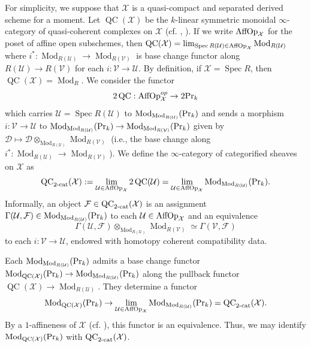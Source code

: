 \documentclass[leqno,12pt]{amsart}
\theoremstyle{plain}
\theoremstyle{definition}
\newcommand{\PR}{\textup{Pr}}
\newcommand{\Spec}{\operatorname{Spec}}
\newcommand{\Mod}{\operatorname{Mod}}
\newcommand{\QC}{\operatorname{QC}}
\newcommand{\XX}{\mathcal{X}}
\begin{document}
For simplicity, we suppose that $\mathcal{X}$ is a quasi-compact and separated derived scheme for a moment.
Let $\QC(\mathcal{X})$ be the $k$-linear symmetric monoidal $\infty$-category of quasi-coherent complexes on $\mathcal{X}$ (cf. \cite[VIII]{DAG}, \cite{BFN}).
If we write $\textup{AffOp}_{\XX}$ for the poset of affine open subschemes, then 
$\QC(\XX)=\lim_{\Spec R(\mathcal{U})\in \textup{AffOp}_{\XX}}\Mod_{R(\mathcal{U})}$ where $i^*:\Mod_{R(\mathcal{U})}\to \Mod_{R(\mathcal{V})}$
is base change functor along $R(\mathcal{U})\to R(\mathcal{V})$
for each $i:\mathcal{V}\to \mathcal{U}$. By definition, if $\XX=\Spec R$, then $\QC(\XX)=\Mod_R$.
We consider the functor 
\[
2\QC:\textup{AffOp}_{\XX}^{op} \to 2\PR_k
\]
which carries $\mathcal{U}=\Spec R(\mathcal{U})$ to $\Mod_{\Mod_{R(\mathcal{U})}}(\PR_k)$
and sends a morphism $i:\mathcal{V}\to \mathcal{U}$ to $\Mod_{\Mod_{R(\mathcal{U})}}(\PR_k)\to \Mod_{\Mod_{R(\mathcal{V})}}(\PR_k)$
given by $\mathcal{D}\mapsto \mathcal{D}\otimes_{\Mod_{R(\mathcal{U})}}\Mod_{R(\mathcal{V})}$ (i.e., 
the base change along $i^*:\Mod_{R(\mathcal{U})}\to \Mod_{R(\mathcal{V})}$). We define the $\infty$-category of categorified sheaves on $\XX$ as
\[
\textup{QC}_{\textup{2-cat}}(\XX):=\lim_{\mathcal{U}\in \textup{AffOp}_{\XX}}2\QC(\mathcal{U})=\lim_{\mathcal{U}\in \textup{AffOp}_{\XX}}\Mod_{\Mod_{R(\mathcal{U})}}(\PR_k).
\]
Informally, an object $\mathcal{F}\in \textup{QC}_{\textup{2-cat}}(\XX)$ is an assignment 
$\Gamma(\mathcal{U}, \mathcal{F})\in\Mod_{\Mod_{R(\mathcal{U})}}(\PR_k) $ to each $\mathcal{U}\in \textup{AffOp}_{\XX}$
and an equivalence
\[
\Gamma(\mathcal{U}, \mathcal{F})\otimes_{\Mod_{R(\mathcal{U})}}\Mod_{R(\mathcal{V})}\simeq \Gamma(\mathcal{V}, \mathcal{F})
\]
to each $i:\mathcal{V}\to\mathcal{U}$, endowed with homotopy coherent compatibility data.

Each $\Mod_{\Mod_{R(\mathcal{U})}}(\PR_k)$ admits a base change functor $\Mod_{\QC(\XX)}(\PR_k)\to \Mod_{\Mod_{R(\mathcal{U})}}(\PR_k)$
along the pullback functor $\QC(\XX)\to \Mod_{R(\mathcal{U})}$.
They determine a functor
\[
\Mod_{\QC(\XX)}(\PR_k)\to \lim_{\mathcal{U}\in \textup{AffOp}_{\XX}}\Mod_{\Mod_{R(\mathcal{U})}}(\PR_k)=\textup{QC}_{\textup{2-cat}}(\XX).
\]
By a $1$-affineness of $\XX$ (cf. \cite[Theorem 2.1.1]{Gai1aff}), this functor is an equivalence.
Thus, we may identify $\Mod_{\QC(\XX)}(\PR_k)$ with $\textup{QC}_{\textup{2-cat}}(\XX)$.
\end{document}
